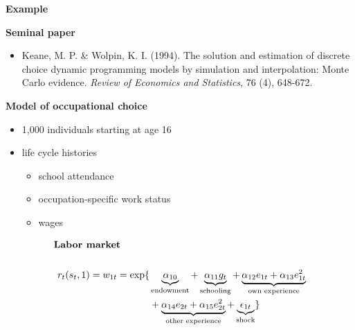 \begin{frame}\begin{center}
\LARGE\textbf{Example}
\end{center}\end{frame}
\begin{frame}\textbf{Seminal paper}\vspace{0.3cm}

\begin{itemize}\setlength\itemsep{1em}
\item Keane, M. P. \& Wolpin, K. I. (1994). The solution and estimation of discrete choice dynamic programming models by simulation and interpolation: Monte Carlo evidence. \textit{Review of Economics and Statistics},  76 (4), 648-672.
\end{itemize}
\end{frame}
\begin{frame}\textbf{Model of occupational choice}\vspace{0.3cm}

\begin{itemize}\setlength\itemsep{1em}
\item 1,000 individuals starting at age 16
\item life cycle histories \medskip
\begin{itemize}\setlength\itemsep{1em}
\item school attendance
\item occupation-specific work status
\item wages
\end{itemize}
\end{itemize}
\end{frame}
\begin{frame}

  \begin{align*}
  \text{\textbf{Labor market}}\qquad\quad & \\
  & \\
  r_t(s_t, 1) =  w_{1t} = \exp\{& \underbrace{\alpha_{10}}_{\text{endowment}} + \underbrace{\alpha_{11} g_t}_{\text{schooling}} + \underbrace{\alpha_{12}e_{1t} + \alpha_{13}e^2_{1t}}_{\text{own experience}} \\
              & + \underbrace{\alpha_{14}e_{2t} + \alpha_{15}e^2_{2t}}_{\text{other experience}} + \underbrace{\epsilon_{1t}}_{\text{shock}}\}
  \end{align*}
  \end{frame}
